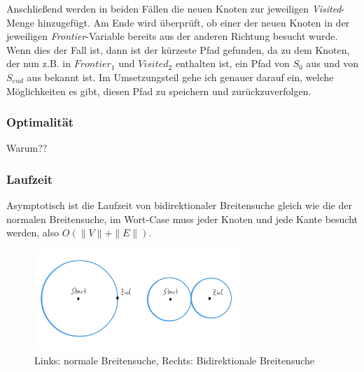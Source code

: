 \documentclass[a4paper,10pt,ngerman]{scrartcl}
\begin{document}
    Anschließend werden in beiden Fällen die neuen Knoten zur jeweiligen \textit{Visited}-Menge hinzugefügt.
    Am Ende wird überprüft, ob einer der neuen Knoten in der jeweiligen \textit{Frontier}-Variable bereits aus der anderen Richtung besucht wurde. Wenn dies der Fall ist, dann ist der kürzeste Pfad gefunden, da zu dem Knoten, der nun z.B. in $\textit{Frontier}_1$ und $\textit{Visited}_2$ enthalten ist, ein Pfad von $S_0$ aus und von $S_{end}$ aus bekannt ist. Im Umsetzungsteil gehe ich genauer darauf ein, welche Möglichkeiten es gibt, diesen Pfad zu speichern und zurückzuverfolgen.

    \subsubsection{Optimalität}
    Warum??

    \subsubsection{Laufzeit}
    Asymptotisch ist die Laufzeit von bidirektionaler Breitensuche gleich wie die der normalen Breitensuche, im Wort-Case muss jeder Knoten und jede Kante besucht werden, also $O(\|V\| + \|E\|)$.
    \begin{figure}[H]
        \label{fig:1}
        \centering
        \includegraphics[width=0.7\textwidth]{Assets/zeichnung}
        \caption {Links: normale Breitensuche, Rechts: Bidirektionale Breitensuche}
    \end{figure}
\end{document}

